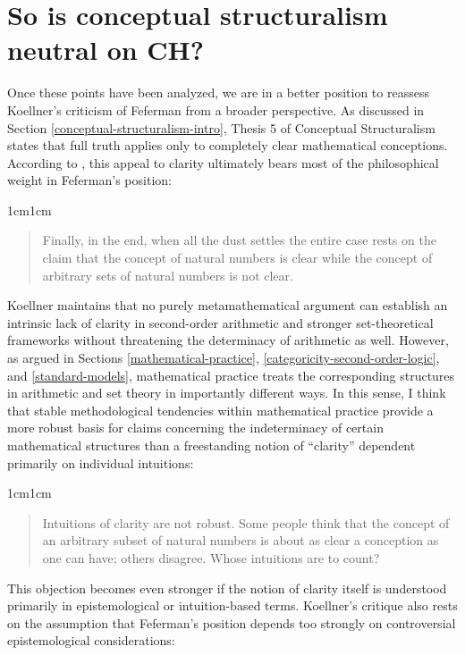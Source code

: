 \documentclass[11pt,a4paper]{book}
\theoremstyle{plain}
\begin{document}
\section{So is conceptual structuralism neutral on CH?}
\label{conclusion-Koellner-clarity}

Once these points have been analyzed, we are in a better position to reassess Koellner's criticism of Feferman from a broader perspective. As discussed in Section \ref{conceptual-structuralism-intro}, Thesis 5 of Conceptual Structuralism states that full truth applies only to completely clear mathematical conceptions. According to \textcite[15]{Koellner2022}, this appeal to clarity ultimately bears most of the philosophical weight in Feferman's position:

\begin{adjustwidth}{1cm}{1cm}
\begin{quote}
\small
Finally, in the end, when all the dust settles the entire case rests on the claim that the concept of natural numbers is clear while the concept of arbitrary sets of natural numbers is not clear.
\end{quote}
\end{adjustwidth}

Koellner maintains that no purely metamathematical argument can establish an intrinsic lack of clarity in second-order arithmetic and stronger set-theoretical frameworks without threatening the determinacy of arithmetic as well. However, as argued in Sections \ref{mathematical-practice}, \ref{categoricity-second-order-logic}, and \ref{standard-models}, mathematical practice treats the corresponding structures in arithmetic and set theory in importantly different ways. In this sense, I think that stable methodological tendencies within mathematical practice provide a more robust basis for claims concerning the indeterminacy of certain mathematical structures than a freestanding notion of ``clarity'' dependent primarily on individual intuitions:

\begin{adjustwidth}{1cm}{1cm}
\begin{quote}
\small
Intuitions of clarity are not robust. Some people think that the concept of an arbitrary subset of natural numbers is about as clear a conception as one can have; others disagree. Whose intuitions are to count? \textcite[14]{Koellner2022}
\end{quote}
\end{adjustwidth}

This objection becomes even stronger if the notion of clarity itself is understood primarily in epistemological or intuition-based terms. Koellner's critique also rests on the assumption that Feferman's position depends too strongly on controversial epistemological considerations:
\end{document}
